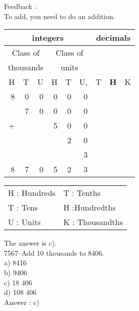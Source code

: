 \documentclass[letterpaper, 12pt]{article}
\begin{document}
Feedback :\\
To add, you need to do an addition.
\begin{center}
\begin{tabular}{|rrr|rrr|rrr|}
\hline
\multicolumn{6}{|c|}{integers} &\multicolumn{3}{|c|}{decimals} \\
\hline
\multicolumn{3}{|c|}{Class of} &\multicolumn{3}{|c|}{Class of} &  \multicolumn{3}{c|}{} \\
\multicolumn{3}{|c|}{thousands} &\multicolumn{3}{|c|}{units} &  \multicolumn{3}{c|}{} \\
\hline
H & T & U &H & T & U, & T\up{th} & \textbf{H\up{th}} & K\up{th} \\
\hline
\hline
8 & 0 & 0 & 0 & 0 & 0 &  & &\\
 & 7 & 0 & 0 & 0 & 0 &  & &\\
+ &  &  & 5 & 0 & 0 &  & &\\
 &  &  &  & 2 & 0 &  & &\\
 &  &  &  &  & 3 &  & &\\
\hline
\hline
 8 & 7 & 0 & 5 & 2 & 3 &  & &
\\
\hline
\end{tabular}
\end{center}

\scriptsize
\begin{center}
\begin{tabular}{ll}
H : Hundreds & T\up{th} : Tenths\\
T : Tens & H\up{th} :Hundredths\\
U : Units & K\up{e} : Thousandths\\
\end{tabular}
\end{center}

\normalsize
The answer is c).\\




7567--Add 10 thousands to 8406.\\

a) 8416\\
b) 9406\\
c) 18 406\\
d) 108 406\\

Answer : c)\\
\end{document}
